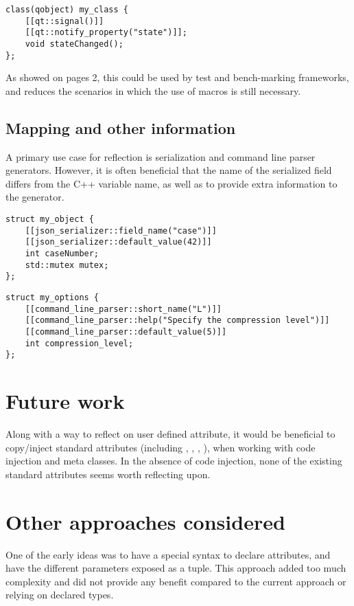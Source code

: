 \documentclass{wg21}
\begin{document}
\begin{verbatim}
class(qobject) my_class {
    [[qt::signal()]]
    [[qt::notify_property("state")]]; 
    void stateChanged();
};

\end{verbatim}

As showed on pages 2, this could be used by test and bench-marking frameworks, and reduces the scenarios in which the use of macros
is still necessary.


\subsection{Mapping and other information}

A primary use case for reflection is serialization and command line parser generators.
However, it is often beneficial that the name of the serialized field differs from the C++ variable name, as well as to provide extra information to the generator.

\begin{verbatim}
struct my_object {
    [[json_serializer::field_name("case")]]
    [[json_serializer::default_value(42)]]
    int caseNumber;
    std::mutex mutex;
};
\end{verbatim}


\begin{verbatim}
struct my_options {
    [[command_line_parser::short_name("L")]]
    [[command_line_parser::help("Specify the compression level")]]
    [[command_line_parser::default_value(5)]]
    int compression_level;
};
\end{verbatim}

\section{Future work}

Along with a way to reflect on user defined attribute, it would be beneficial to copy/inject
standard attributes (including , , , ),
when working with code injection and meta classes.
In the absence of code injection, none of the existing standard attributes seems worth reflecting upon.


\section{Other approaches considered}

One of the early ideas was to have a special syntax to declare attributes, and have the different parameters exposed as a tuple.
This approach added too much complexity and did not provide any benefit compared to the current approach or relying on declared types. 
\end{document}
